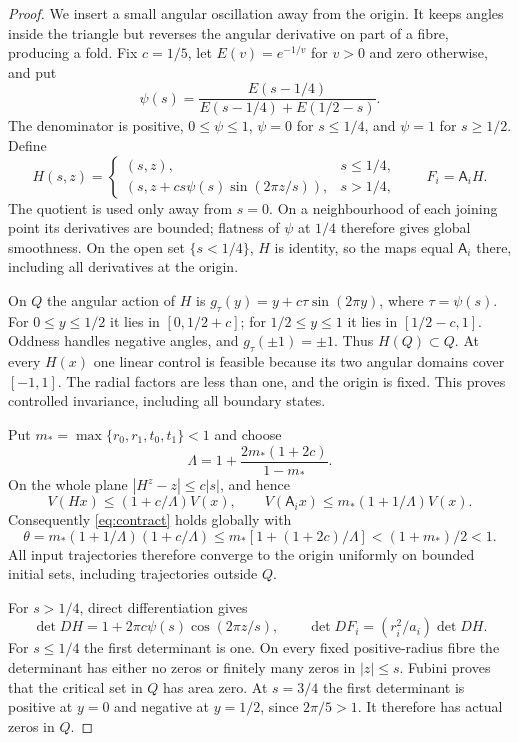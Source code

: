 \documentclass[11pt]{amsart}
\theoremstyle{definition}
\theoremstyle{remark}
\numberwithin{equation}{section}
\begin{document}
\begin{proof}
We insert a small angular oscillation away from the origin. It
keeps angles inside the triangle but reverses the angular derivative
on part of a fibre, producing a fold.
Fix $c=1/5$, let $E(v)=e^{-1/v}$ for $v>0$ and zero otherwise,
and put
\[
\psi(s)=\frac{E(s-1/4)}{E(s-1/4)+E(1/2-s)}.
\]
The denominator is positive, $0\le\psi\le1$,
$\psi=0$ for $s\le1/4$, and $\psi=1$ for $s\ge1/2$.
Define
\begin{equation}\label{eq:fold}
H(s,z)=
\begin{cases}
(s,z),&s\le1/4,\\
(s,z+cs\psi(s)\sin(2\pi z/s)),&s>1/4,
\end{cases}
\qquad F_i=\mathsf A_iH.
\end{equation}
The quotient is used only away from $s=0$. On a neighbourhood
of each joining point its derivatives are bounded; flatness of
$\psi$ at $1/4$ therefore gives global smoothness. On the open
set $\{s<1/4\}$, $H$ is identity, so the maps equal
$\mathsf A_i$ there, including all derivatives at the origin.

On $Q$ the angular action of $H$ is
$g_\tau(y)=y+c\tau\sin(2\pi y)$, where $\tau=\psi(s)$.
For $0\le y\le1/2$ it lies in $[0,1/2+c]$;
for $1/2\le y\le1$ it lies in $[1/2-c,1]$.
Oddness handles negative angles, and $g_\tau(\pm1)=\pm1$.
Thus $H(Q)\subset Q$. At every $H(x)$ one linear control
is feasible because its two angular domains cover $[-1,1]$.
The radial factors are less than one, and the origin is fixed.
This proves controlled invariance, including all boundary states.

Put $m_* =\max\{r_0,r_1,t_0,t_1\}<1$ and choose
\[
\Lambda=1+\frac{2m_*(1+2c)}{1-m_*}.
\]
On the whole plane $|H^z-z|\le c|s|$, and hence
\[
V(Hx)\le(1+c/\Lambda)V(x),\qquad
V(\mathsf A_i x)\le m_*(1+1/\Lambda)V(x).
\]
Consequently \eqref{eq:contract} holds globally with
\[
\theta=m_*(1+1/\Lambda)(1+c/\Lambda)
 \le m_*[1+(1+2c)/\Lambda]<(1+m_*)/2<1.
\]
All input trajectories therefore converge to the origin uniformly
on bounded initial sets, including trajectories outside $Q$.

For $s>1/4$, direct differentiation gives
\begin{equation}\label{eq:foldcritical}
\det DH=1+2\pi c\psi(s)\cos(2\pi z/s),\qquad
\det DF_i=(r_i^2/a_i)\det DH.
\end{equation}
For $s\le1/4$ the first determinant is one. On every fixed
positive-radius fibre the determinant has either no zeros or finitely
many zeros in $|z|\le s$. Fubini proves that the critical set
in $Q$ has area zero. At $s=3/4$ the first determinant is positive
at $y=0$ and negative at $y=1/2$, since $2\pi/5>1$.
It therefore has actual zeros in $Q$.


\end{proof}
\end{document}
